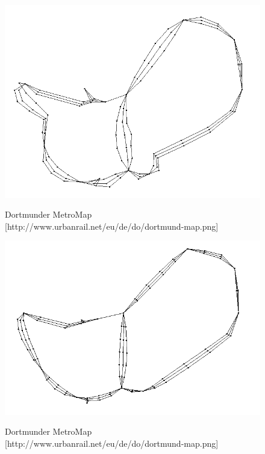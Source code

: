\begin{figure}[t]
	\centering
	{\includegraphics[scale=0.8]{bilder/graph25iterationenreingoldmodified1}\label{fig_dortmundmap}
	}\\
	\caption[Dortmunder MetroMap]{Dortmunder MetroMap [http://www.urbanrail.net/eu/de/do/dortmund-map.png]}
	\label{fig_dortmundmap}
\end{figure}
\begin{figure}[t]
	\centering
	{\includegraphics[scale=0.8]{bilder/graph50iterationenreingoldmodified1}\label{fig_dortmundmap}
	}\\
	\caption[Dortmunder MetroMap]{Dortmunder MetroMap [http://www.urbanrail.net/eu/de/do/dortmund-map.png]}
	\label{fig_dortmundmap}
\end{figure}

